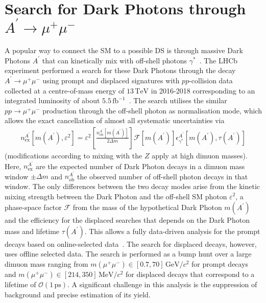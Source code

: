 \documentclass[a4paper,11pt]{article}
\begin{document}
\section{Search for Dark Photons through \boldmath$A^\prime\to\mu^+\mu^-$}
A popular way to connect the SM to a possible DS is through massive Dark Photons $A^\prime$ that can kinetically mix with off-shell photons $\gamma^*$~\cite{DM2016}.
The LHCb experiment performed a search for these Dark Photons through the decay $A^\prime\to\mu^+\mu^-$ using prompt and displaced signatures with $pp$-collision data collected at a centre-of-mass energy of $13\,\text{TeV}$ in 2016-2018 corresponding to an integrated luminosity of about $5.5\,\text{fb}^{-1}$~\cite{DarkPhoton1, DarkPhoton2}. The search utilises the similar $pp\to\mu^+\mu^-$ production through the off-shell photon as normalisation mode, which allows the exact cancellation of almost all systematic uncertainties via 
\begin{align}
n^{A^\prime}_{\text{ex}}[m(A^\prime),\varepsilon^2]=\varepsilon^2{\left[\frac{n^{A^\prime}_{\text{ob}}[m(A^\prime)]}{2\Delta m}\right]}{\mathcal{F}[m(A^\prime)]}{\epsilon^{A^\prime}_{\gamma^*}[m(A^\prime),\tau(A^\prime)]}
\end{align}
(modifications according to mixing with the $Z$ apply at high dimuon masses).
Here, $n^{A^\prime}_{\text{ex}}$ are the expected number of Dark Photon decays in a dimuon mass window $\pm\Delta m$ and $n^{A^\prime}_{\text{ob}}$ the observed number of off-shell photon decays in that window.
The only differences between the two decay modes arise from the kinetic mixing strength between the Dark Photon and the off-shell SM photon $\varepsilon^2$, a phase-space factor $\mathcal{F}$ from the mass of the hypothetical Dark Photon $m(A^\prime)$ and the efficiency for the displaced searches that depends on the Dark Photon mass and lifetime $\tau(A^\prime)$.
This allows a fully data-driven analysis for the prompt decays based on online-selected data~\cite{Trigger_Performance}. The search for displaced decays, however, uses offline selected data.
The search is performed as a bump hunt over a large dimuon mass ranging from $m(\mu^+\mu^-)\in[0.7,70]\,\text{GeV}/c^2$ for prompt decays and $m(\mu^+\mu^-)\in[214,350]\,\text{MeV}/c^2$ for displaced decays that correspond to a lifetime of $\mathcal{O}(1\,\text{ps})$.
A significant challenge in this analysis is the suppression of background and precise estimation of its yield.
\end{document}
